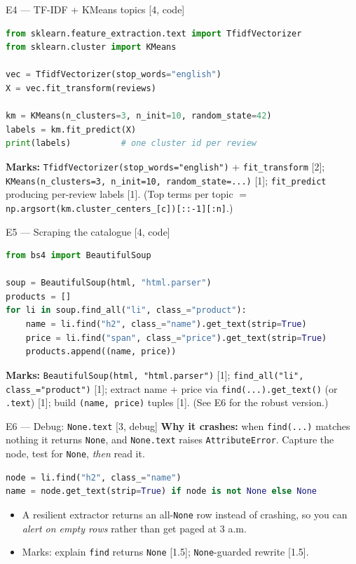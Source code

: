 \documentclass[aspectratio=169,11pt]{beamer}
\begin{document}
\begin{frame}[fragile]{E4 --- TF-IDF + KMeans topics \hfill [4, code]}
\begin{lstlisting}[language=Python]
from sklearn.feature_extraction.text import TfidfVectorizer
from sklearn.cluster import KMeans

vec = TfidfVectorizer(stop_words="english")
X = vec.fit_transform(reviews)

km = KMeans(n_clusters=3, n_init=10, random_state=42)
labels = km.fit_predict(X)
print(labels)          # one cluster id per review
\end{lstlisting}
\textbf{Marks:} \texttt{TfidfVectorizer(stop\_words="english")} + \texttt{fit\_transform} [2]; \texttt{KMeans(n\_clusters=3, n\_init=10, random\_state=...)} [1]; \texttt{fit\_predict} producing per-review labels [1]. (Top terms per topic $=$ \texttt{np.argsort(km.cluster\_centers\_[c])[::-1][:n]}.)
\end{frame}

\begin{frame}[fragile]{E5 --- Scraping the catalogue \hfill [4, code]}
\begin{lstlisting}[language=Python]
from bs4 import BeautifulSoup

soup = BeautifulSoup(html, "html.parser")
products = []
for li in soup.find_all("li", class_="product"):
    name = li.find("h2", class_="name").get_text(strip=True)
    price = li.find("span", class_="price").get_text(strip=True)
    products.append((name, price))
\end{lstlisting}
\textbf{Marks:} \texttt{BeautifulSoup(html, "html.parser")} [1]; \texttt{find\_all("li", class\_="product")} [1]; extract name + price via \texttt{find(...).get\_text()} (or \texttt{.text}) [1]; build \texttt{(name, price)} tuples [1]. (See E6 for the robust version.)
\end{frame}

\begin{frame}[fragile]{E6 --- Debug: \texttt{None.text} \hfill [3, debug]}
\textbf{Why it crashes:} when \texttt{find(...)} matches nothing it returns \texttt{None}, and \texttt{None.text} raises \texttt{AttributeError}. Capture the node, test for \texttt{None}, \emph{then} read it.
\begin{lstlisting}[language=Python]
node = li.find("h2", class_="name")
name = node.get_text(strip=True) if node is not None else None
\end{lstlisting}
\begin{itemize}
  \item A resilient extractor returns an all-\texttt{None} row instead of crashing, so you can \emph{alert on empty rows} rather than get paged at 3 a.m.
  \item Marks: explain \texttt{find} returns \texttt{None} [1.5]; \texttt{None}-guarded rewrite [1.5].
\end{itemize}
\end{frame}
\end{document}
